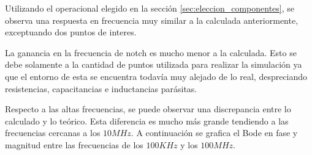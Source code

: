 Utilizando el operacional elegido en la sección \ref{sec:eleccion_componentes}, se observa una respuesta en frecuencia muy similar a la calculada anteriormente, exceptuando dos puntos de interes.

La ganancia en la frecuencia de notch es mucho menor a la calculada. Esto se debe solamente a la cantidad de puntos utilizada para realizar la simulación ya que el entorno de esta se encuentra todavía muy alejado de lo real, despreciando resistencias, capacitancias e inductancias parásitas.

Respecto a las altas frecuencias, se puede observar una discrepancia entre lo calculado y lo teórico. Esta diferencia es mucho más grande tendiendo a las frecuencias cercanas a los $10MHz$. A continuación se grafica el Bode en fase y magnitud entre las frecuencias de los $100KHz$ y los $100MHz$.

